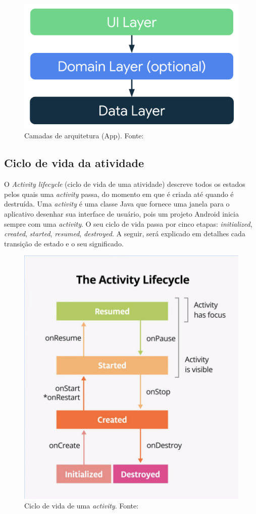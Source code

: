 \begin{figure}[ht]
    \centering
    \includegraphics[width=.63\textwidth]{img/app-android-layers.png}
    \caption{Camadas de arquitetura (App). Fonte: \cite{google-developers-guideline}}\label{figAppLayer}
\end{figure}

\subsection{Ciclo de vida da atividade}\label{ciclo-de-vida}

O \textit{Activity lifecycle} (ciclo de vida de uma atividade) descreve todos os estados pelos quais uma \textit{activity} passa, do momento em que é criada
até quando é destruída. Uma \textit{activity} é uma classe Java que fornece uma janela para o aplicativo desenhar sua interface de usuário, pois um projeto Android 
inicia sempre com uma \textit{activity}. O seu ciclo de vida passa por cinco etapas: 
\textit{initialized}, \textit{created}, \textit{started}, \textit{resumed}, \textit{destroyed}. A seguir, será explicado em detalhes
cada transição de estado e o seu significado.

\begin{figure}[ht]
    \centering
    \includegraphics[width=.44\textwidth]{img/activity-lifecycle.png}
    \caption{Ciclo de vida de uma \textit{activity}. Fonte: \cite{google-developers-activity-lifecycle}}\label{figActivityLifeCycle}
\end{figure}

